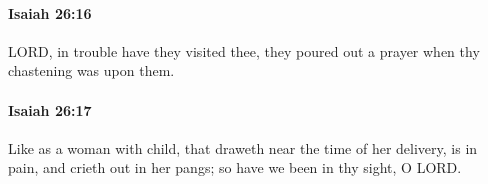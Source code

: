 		\paragraph{Isaiah 26:16} %
			\label{ISAIAH-26-16}

			LORD, in trouble have they visited thee, they poured out a prayer when thy chastening was upon them.


		\paragraph{Isaiah 26:17} %
			\label{ISAIAH-26-17}

			Like as a woman with child, that draweth near the time of her delivery, is in pain, and crieth out in her pangs; so have we been in thy sight, O LORD.


